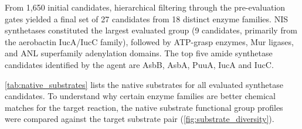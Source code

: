 \documentclass[12pt]{article}
\begin{document}
From 1,650 initial candidates, hierarchical filtering through the pre-evaluation gates yielded a final set of 27 candidates from 18 distinct enzyme families. NIS synthetases constituted the largest evaluated group (9 candidates, primarily from the aerobactin IucA/IucC family), followed by ATP-grasp enzymes, Mur ligases, and ANL superfamily adenylation domains. The top five amide synthetase candidates identified by the agent are AsbB, AsbA, PuuA, IucA and IucC.

\autoref{tab:native_substrates} lists the native substrates for all evaluated synthetase candidates. To understand why certain enzyme families are better chemical matches for the target reaction, the native substrate functional group profiles were compared against the target substrate pair (\autoref{fig:substrate_diversity}).
\end{document}
